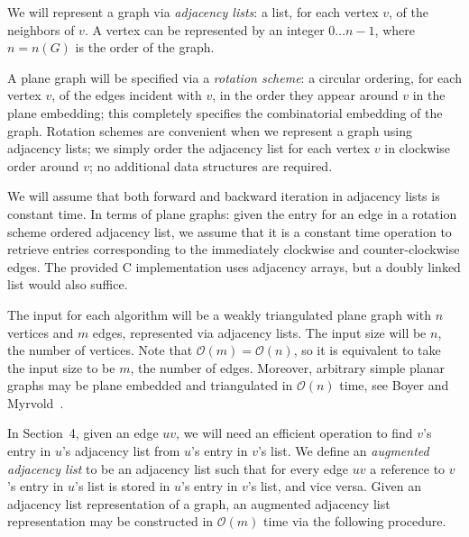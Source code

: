 \documentclass[12pt,letterpaper]{article}
\theoremstyle{plain}
\theoremstyle{definition}
\theoremstyle{break}
\newcommand{\defterm}[1]{\emph{#1}} %
\begin{document}
We will represent a graph via \textit{adjacency lists}:
a list, for each vertex $v$, of the neighbors of $v$.
A vertex can be represented by an integer $0\dots n-1$,
where $n=n(G)$ is the order of the graph.

A plane graph will be specified via
a \defterm{rotation scheme}:
a circular ordering,
for each vertex $v$, of the edges incident with $v$,
in the order they appear around $v$ in the plane embedding;
this completely specifies
the combinatorial embedding of the graph.
Rotation schemes are convenient when we represent a graph
using adjacency lists;
we simply order the adjacency
list for each vertex $v$ in clockwise order around $v$;
no additional data structures are required.

We will assume that both forward and backward iteration in adjacency lists
is constant time. In terms of plane graphs: given the entry for an edge in a
rotation scheme ordered adjacency list, we assume that it is a
constant time operation to retrieve entries corresponding to the
immediately clockwise and counter-clockwise edges. The provided
C implementation uses adjacency arrays, but a doubly linked list
would also suffice.

The input for each algorithm will be a weakly triangulated plane graph with
$n$ vertices and $m$ edges, represented
via adjacency lists. The input size will be $n$, the number of vertices. Note
that $\mathcal{O}(m)=\mathcal{O}(n)$, so it is equivalent to take the input size
to be $m$, the number of edges. Moreover, arbitrary simple planar graphs may be
plane embedded and triangulated in $\mathcal{O}(n)$ time, see Boyer and
Myrvold~\cite{BoMy2004}.

In Section~4, given an edge $uv$, we will need an efficient operation to
find $v$'s entry in $u$'s adjacency list from $u$'s entry in $v$'s list.
We define an \defterm{augmented adjacency list} to be an adjacency list such
that for
every edge $uv$ a reference to $v$'s entry in
$u$'s list is stored in $u$'s entry in $v$'s list, and vice versa. Given an
adjacency list representation of a graph, an augmented
adjacency list representation may be constructed in $\mathcal{O}(m)$ time via
the following procedure.
\end{document}
